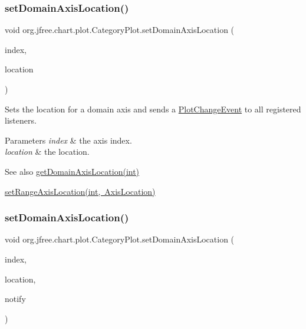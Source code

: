 \subsubsection{\texorpdfstring{set\+Domain\+Axis\+Location()}{setDomainAxisLocation()}\hspace{0.1cm}{\footnotesize\ttfamily [3/4]}}
{\footnotesize\ttfamily void org.\+jfree.\+chart.\+plot.\+Category\+Plot.\+set\+Domain\+Axis\+Location (\begin{DoxyParamCaption}\item[{int}]{index,  }\item[{\mbox{\hyperlink{classorg_1_1jfree_1_1chart_1_1axis_1_1_axis_location}{Axis\+Location}}}]{location }\end{DoxyParamCaption})}

Sets the location for a domain axis and sends a \mbox{\hyperlink{}{Plot\+Change\+Event}} to all registered listeners.


\begin{DoxyParams}{Parameters}
{\em index} & the axis index. \\
\hline
{\em location} & the location.\\
\hline
\end{DoxyParams}
\begin{DoxySeeAlso}{See also}
\mbox{\hyperlink{classorg_1_1jfree_1_1chart_1_1plot_1_1_category_plot_a6d3f3b7805d1a24832cf40fa95a56fdc}{get\+Domain\+Axis\+Location(int)}} 

\mbox{\hyperlink{classorg_1_1jfree_1_1chart_1_1plot_1_1_category_plot_a242adbc02f7e5b651062dbddfcfd9765}{set\+Range\+Axis\+Location(int, Axis\+Location)}} 
\end{DoxySeeAlso}
\mbox{\label{classorg_1_1jfree_1_1chart_1_1plot_1_1_category_plot_ae217c40729a549c9da9032bdf17d5654}} 
\subsubsection{\texorpdfstring{set\+Domain\+Axis\+Location()}{setDomainAxisLocation()}\hspace{0.1cm}{\footnotesize\ttfamily [4/4]}}
{\footnotesize\ttfamily void org.\+jfree.\+chart.\+plot.\+Category\+Plot.\+set\+Domain\+Axis\+Location (\begin{DoxyParamCaption}\item[{int}]{index,  }\item[{\mbox{\hyperlink{classorg_1_1jfree_1_1chart_1_1axis_1_1_axis_location}{Axis\+Location}}}]{location,  }\item[{boolean}]{notify }\end{DoxyParamCaption})}

